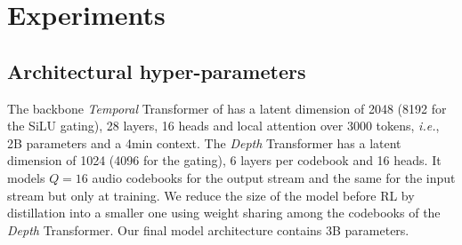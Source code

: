 \section{Experiments}

\subsection{Architectural hyper-parameters}
\label{sec:arch_hyper_params}
The backbone \emph{Temporal} Transformer of \ours{} has a latent dimension of 2048 (8192 for the SiLU gating), 28 layers, 16 heads and local attention over 3000 tokens, \emph{i.e.}, 2B parameters and a 4min context. The \emph{Depth} Transformer has a latent dimension of 1024 (4096 for the gating), 6 layers per codebook and 16 heads. It models $Q=16$ audio codebooks for the output stream and the same for the input stream but only at training. We reduce the size of the model before RL by distillation into a smaller one using weight sharing among the codebooks of the \emph{Depth} Transformer. Our final model architecture contains 3B parameters.

